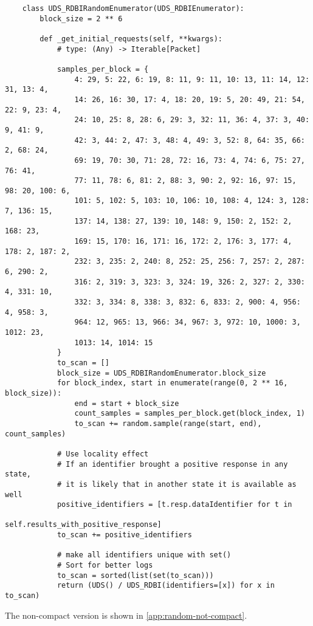 \begin{verbatim}
    class UDS_RDBIRandomEnumerator(UDS_RDBIEnumerator):
        block_size = 2 ** 6
    
        def _get_initial_requests(self, **kwargs):
            # type: (Any) -> Iterable[Packet]
    
            samples_per_block = {
                4: 29, 5: 22, 6: 19, 8: 11, 9: 11, 10: 13, 11: 14, 12: 31, 13: 4,
                14: 26, 16: 30, 17: 4, 18: 20, 19: 5, 20: 49, 21: 54, 22: 9, 23: 4,
                24: 10, 25: 8, 28: 6, 29: 3, 32: 11, 36: 4, 37: 3, 40: 9, 41: 9,
                42: 3, 44: 2, 47: 3, 48: 4, 49: 3, 52: 8, 64: 35, 66: 2, 68: 24,
                69: 19, 70: 30, 71: 28, 72: 16, 73: 4, 74: 6, 75: 27, 76: 41,
                77: 11, 78: 6, 81: 2, 88: 3, 90: 2, 92: 16, 97: 15, 98: 20, 100: 6,
                101: 5, 102: 5, 103: 10, 106: 10, 108: 4, 124: 3, 128: 7, 136: 15,
                137: 14, 138: 27, 139: 10, 148: 9, 150: 2, 152: 2, 168: 23,
                169: 15, 170: 16, 171: 16, 172: 2, 176: 3, 177: 4, 178: 2, 187: 2,
                232: 3, 235: 2, 240: 8, 252: 25, 256: 7, 257: 2, 287: 6, 290: 2,
                316: 2, 319: 3, 323: 3, 324: 19, 326: 2, 327: 2, 330: 4, 331: 10,
                332: 3, 334: 8, 338: 3, 832: 6, 833: 2, 900: 4, 956: 4, 958: 3,
                964: 12, 965: 13, 966: 34, 967: 3, 972: 10, 1000: 3, 1012: 23,
                1013: 14, 1014: 15
            }
            to_scan = []
            block_size = UDS_RDBIRandomEnumerator.block_size
            for block_index, start in enumerate(range(0, 2 ** 16, block_size)):
                end = start + block_size
                count_samples = samples_per_block.get(block_index, 1)
                to_scan += random.sample(range(start, end), count_samples)
    
            # Use locality effect
            # If an identifier brought a positive response in any state,
            # it is likely that in another state it is available as well
            positive_identifiers = [t.resp.dataIdentifier for t in
                                    self.results_with_positive_response]
            to_scan += positive_identifiers
    
            # make all identifiers unique with set()
            # Sort for better logs
            to_scan = sorted(list(set(to_scan)))
            return (UDS() / UDS_RDBI(identifiers=[x]) for x in to_scan)
\end{verbatim}

The non-compact version is shown in \autoref{app:random-not-compact}.

